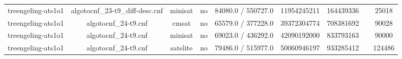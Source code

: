 \begin{appendices}
\begin{table}[p]
\begin{center}
\begin{tabular}{l|cccccccc}
  treengeling-ats1o1             & algotocnf\_23-t9\_diff-desc.cnf & minisat    & no    & 84080.0 / 550727.0 & 11954245211 & 164439336 &            & 25018 \\ %
  treengeling-ats1o1             & algotocnf\_24-t9.cnf           & cmsat      & no    & 65579.0 / 377228.0 & 39372304774 & 708381692 &            & 90028 \\ %
  treengeling-ats1o1             & algotocnf\_24-t9.cnf           & minisat    & no    & 69023.0 / 436292.0 & 42090192000 & 833793163 &            & 90000 \\ %
  treengeling-ats1o1             & algotocnf\_24-t9.cnf           & satelite   & no    & 79486.0 / 515977.0 & 50060946197 & 933285412 &            & 124486 \\ %
    \end{tabular}
  \end{center}
\end{table}

\newpage


\end{appendices}
